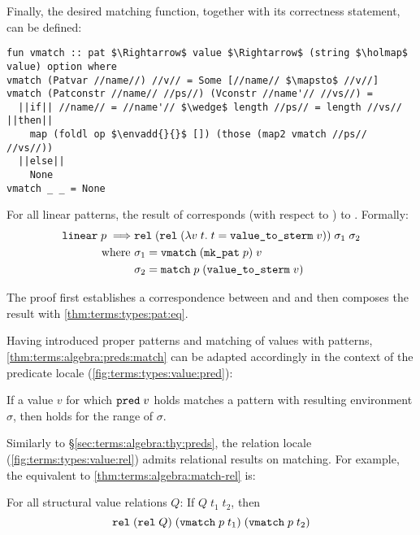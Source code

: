 \noindent
Finally, the desired matching function, together with its correctness statement, can be defined:
%
\begin{lstlisting}
fun vmatch :: pat $\Rightarrow$ value $\Rightarrow$ (string $\holmap$ value) option where
vmatch (Patvar //name//) //v// = Some [//name// $\mapsto$ //v//]
vmatch (Patconstr //name// //ps//) (Vconstr //name'// //vs//) =
  ||if|| //name// = //name'// $\wedge$ length //ps// = length //vs// ||then||
    map (foldl op $\envadd{}{}$ []) (those (map2 vmatch //ps// //vs//))
  ||else||
    None
vmatch _ _ = None
\end{lstlisting}
%
\begin{lemma}
  For all linear patterns, the result of  corresponds (with respect to ) to . Formally:
  \begin{align*}
    \texttt{\textup{linear}}\;p \implies &\texttt{\textup{rel}}\;(\texttt{\textup{rel}}\;(\lambda v\; t.\; t = \texttt{\textup{value\_to\_sterm}}\;v))\;\sigma_1\;\sigma_2 \\
    \text{where } &\sigma_1 = \texttt{\textup{vmatch}}\;(\texttt{\textup{mk\_pat}}\;p)\;v \\
    &\sigma_2 = \texttt{\textup{match}}\;p\;( \texttt{\textup{value\_to\_sterm}}\;v)
  \end{align*}
\end{lemma}

\noindent
The proof first establishes a correspondence between  and  and then composes the result with \cref{thm:terms:types:pat:eq}.

Having introduced proper patterns and matching of values with patterns, \cref{thm:terms:algebra:preds:match} can be adapted accordingly in the context of the predicate locale (\cref{fig:terms:types:value:pred}):
%
\begin{lemma}
  If a value $v$ for which $\texttt{\textup{pred}}\;v$ holds matches a pattern with resulting environment $\sigma$, then  holds for the range of $\sigma$.
\end{lemma}

\noindent
Similarly to §\ref{sec:terms:algebra:thy:preds}, the relation locale (\cref{fig:terms:types:value:rel}) admits relational results on matching.
For example, the equivalent to \cref{thm:terms:algebra:match-rel} is:
%
\begin{lemma}
  For all structural value relations $Q$:
  If $Q\;t_1\;t_2$, then
  \[ \texttt{\textup{rel}}\;\allowbreak(\texttt{\textup{rel}}\;Q)\allowbreak\;(\texttt{\textup{vmatch}}\;p\;t_1)\;(\texttt{\textup{vmatch}}\;p\;t_2) \]
\end{lemma}